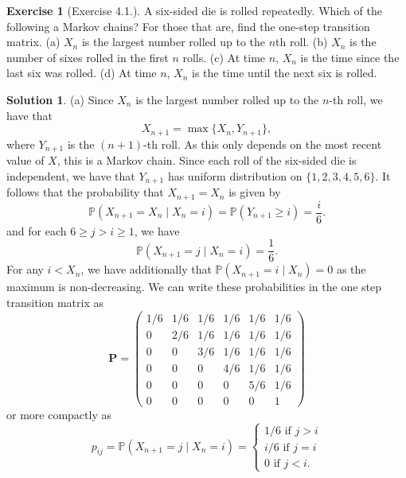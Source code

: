 \documentclass[12pt]{article}
\newcommand{\Prob}{\mathbb{P}}
\let\vec\mathbf
\theoremstyle{definition}
\newtheorem{exer}{Exercise}
\newtheorem{sol}{Solution}
\theoremstyle{remark}
\begin{document}
\begin{exer}[Exercise 4.1.]
    A six-sided die is rolled repeatedly. Which of the following a Markov chains? For those that are, find the one-step transition matrix. (a) $X_{n}$ is the largest number rolled up to the $n$th roll. (b) $X_{n}$ is the number of sixes rolled in the first $n$ rolls. (c) At time $n$, $X_{n}$ is the time since the last six was rolled. (d) At time $n$, $X_{n}$ is the time until the next six is rolled.
\end{exer}

\begin{sol}

    (a) Since $X_{n}$ is the largest number rolled up to the $n$-th roll, we have that 
    \begin{equation*}
        X_{n+1} = \max\{ X_{n}, Y_{n+1} \},
    \end{equation*}
    where $Y_{n+1}$ is the $(n+1)$-th roll. As this only depends on the most recent value of $X$, this is a Markov chain. Since each roll of the six-sided die is independent, we have that $Y_{n+1}$ has uniform distribution on $\{1,2,3,4,5,6 \}$. It follows that the probability that $X_{n+1} = X_{n}$ is given by
\begin{equation*}
    \Prob(X_{n+1} = X_{n} \mid X_{n} = i) = \Prob(Y_{n+1} \geq i) = \frac{i}{6}.
\end{equation*}
    and for each $ 6\geq j > i \geq 1$, we have 
\begin{equation*}
    \Prob(X_{n+1} = j \mid X_{n} = i) =  \frac{1}{6}.
\end{equation*}
For any $i < X_{n}$, we have additionally that $    \Prob(X_{n+1} = i \mid X_{n}) =  0$ as the maximum is non-decreasing. We can write these probabilities in the one step transition matrix as 
\begin{equation*}
\vec{P} = \begin{pmatrix}
    1 / 6 & 1 / 6 & 1 / 6 & 1 / 6 & 1 / 6 & 1 / 6 \\
    0 & 2 / 6  & 1 / 6 & 1 / 6 & 1 / 6 & 1 / 6 \\
    0 & 0      & 3 / 6 & 1 / 6 & 1 / 6 & 1 / 6 \\
    0 & 0      & 0     & 4 / 6 & 1 / 6 & 1 / 6 \\
    0 & 0      & 0     & 0     & 5 / 6 & 1 / 6 \\
    0 & 0      & 0     & 0     & 0     & 1 
\end{pmatrix}
\end{equation*}
or more compactly as 
\begin{equation*}
    p_{ij} = \Prob(X_{n+1} = j \mid X_{n} = i) 
    =
    \begin{cases}
        1 / 6 \text{ if } j > i \\
        i / 6 \text { if } j = i \\
        0 \text{ if } j < i.
    \end{cases}
\end{equation*}
\newpage


\end{sol}
\end{document}
